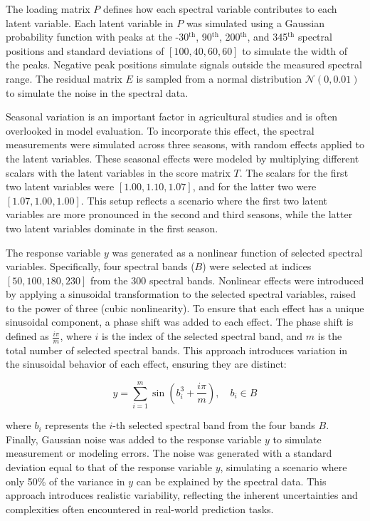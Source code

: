 The loading matrix $P$ defines how each spectral variable contributes to each latent variable. Each latent variable in $P$ was simulated using a Gaussian probability function with peaks at the -30$^\text{th}$, 90$^\text{th}$, 200$^\text{th}$, and 345$^\text{th}$ spectral positions and standard deviations of $[100, 40, 60, 60]$ to simulate the width of the peaks. Negative peak positions simulate signals outside the measured spectral range. The residual matrix $E$ is sampled from a normal distribution $\mathcal{N}(0, 0.01)$ to simulate the noise in the spectral data. 

Seasonal variation is an important factor in agricultural studies and is often overlooked in model evaluation. To incorporate this effect, the spectral measurements were simulated across three seasons, with random effects applied to the latent variables. These seasonal effects were modeled by multiplying different scalars with the latent variables in the score matrix $T$. The scalars for the first two latent variables were $[1.00, 1.10, 1.07]$, and for the latter two were $[1.07, 1.00, 1.00]$. This setup reflects a scenario where the first two latent variables are more pronounced in the second and third seasons, while the latter two latent variables dominate in the first season.

The response variable $y$ was generated as a nonlinear function of selected spectral variables. Specifically, four spectral bands ($B$) were selected at indices $[50, 100, 180, 230]$ from the 300 spectral bands. Nonlinear effects were introduced by applying a sinusoidal transformation to the selected spectral variables, raised to the power of three (cubic nonlinearity). To ensure that each effect has a unique sinusoidal component, a phase shift was added to each effect. The phase shift is defined as $\frac{i \pi}{m}$, where $i$ is the index of the selected spectral band, and $m$ is the total number of selected spectral bands. This approach introduces variation in the sinusoidal behavior of each effect, ensuring they are distinct:

$$
y = \sum_{i=1}^{m}\sin(b^3_i + \frac{i \pi}{m}), \quad b_i \in B
$$

where $b_i$ represents the $i$-th selected spectral band from the four bands $B$. Finally, Gaussian noise was added to the response variable $y$ to simulate measurement or modeling errors. The noise was generated with a standard deviation equal to that of the response variable $y$, simulating a scenario where only 50\% of the variance in $y$ can be explained by the spectral data. This approach introduces realistic variability, reflecting the inherent uncertainties and complexities often encountered in real-world prediction tasks.



